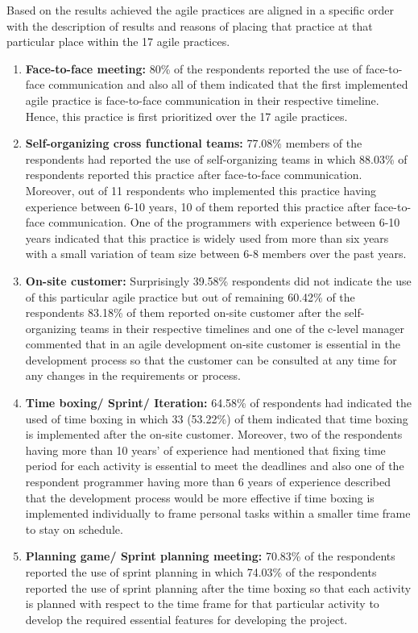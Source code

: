 \documentclass[a4paper,oneside]{bth}
\begin{document}
Based on the results achieved the agile practices are aligned in a specific order with the description of results and reasons of placing that practice at that particular place within the 17 agile practices.
\begin{enumerate}
\item \textbf{Face-to-face meeting:} 80\% of the respondents reported the use of face-to-face communication and also all of them indicated that the first implemented agile practice is face-to-face communication in their respective timeline. Hence, this practice is first prioritized over the 17 agile practices.
\item \textbf{Self-organizing cross functional teams:} 77.08\% members of the respondents had reported the use of self-organizing teams in which 88.03\% of respondents reported this practice after face-to-face communication. Moreover, out of 11 respondents who implemented this practice having experience between 6-10 years, 10 of them reported this practice after face-to-face communication. One of the programmers with experience between 6-10 years indicated that this practice is widely used from more than six years with a small variation of team size between 6-8 members over the past years.
\item \textbf{On-site customer:} Surprisingly 39.58\% respondents did not indicate the use of this particular agile practice but out of remaining 60.42\% of the respondents 83.18\% of them reported on-site customer after the self-organizing teams in their respective timelines and one of the c-level manager commented that in an agile development on-site customer is essential in the development process so that the customer can be consulted at any time for any changes in the requirements or process.
\item \textbf{Time boxing/ Sprint/ Iteration:} 64.58\% of respondents had indicated the used of time boxing in which 33 (53.22\%) of them indicated that time boxing is implemented after the on-site customer. Moreover, two of the respondents having more than 10 years’ of experience had mentioned that fixing time period for each activity is essential to meet the deadlines and also one of the respondent programmer having more than 6 years of experience described that the development process would be more effective if time boxing is implemented individually to frame personal tasks within a smaller time frame to stay on schedule.
\item  \textbf{Planning game/ Sprint planning meeting:} 70.83\% of the respondents reported the use of sprint planning in which 74.03\% of the respondents reported the use of sprint planning after the time boxing so that each activity is planned with respect to the time frame for that particular activity to develop the required essential features for developing the project.

\end{enumerate}
\end{document}
